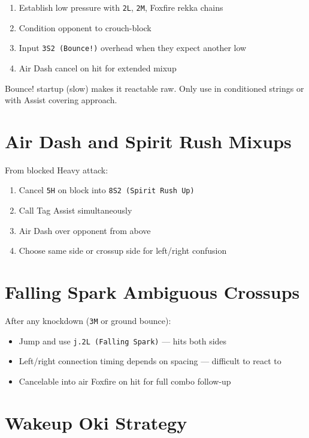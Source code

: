 \documentclass[12pt, a4paper]{report}
\newcommand{\notation}[1]{{\small\texttt{\textcolor{ahriCyan}{#1}}}}
\begin{document}
\begin{enumerate}
  \item Establish low pressure with \notation{2L}, \notation{2M}, Foxfire rekka chains
  \item Condition opponent to crouch-block
  \item Input \notation{3S2 (Bounce!)} overhead when they expect another low
  \item Air Dash cancel on hit for extended mixup
\end{enumerate}

\begin{warnbox}
Bounce! startup (slow) makes it reactable raw. Only use in conditioned strings or with Assist covering approach.
\end{warnbox}

\section{Air Dash and Spirit Rush Mixups}

From blocked Heavy attack:

\begin{enumerate}
  \item Cancel \notation{5H} on block into \notation{8S2 (Spirit Rush Up)}
  \item Call Tag Assist simultaneously
  \item Air Dash over opponent from above
  \item Choose same side or crossup side for left/right confusion
\end{enumerate}

\section{Falling Spark Ambiguous Crossups}

After any knockdown (\notation{3M} or ground bounce):

\begin{itemize}
  \item Jump and use \notation{j.2L (Falling Spark)} --- hits both sides
  \item Left/right connection timing depends on spacing --- difficult to react to
  \item Cancelable into air Foxfire on hit for full combo follow-up
\end{itemize}

\section{Wakeup Oki Strategy}
\end{document}
